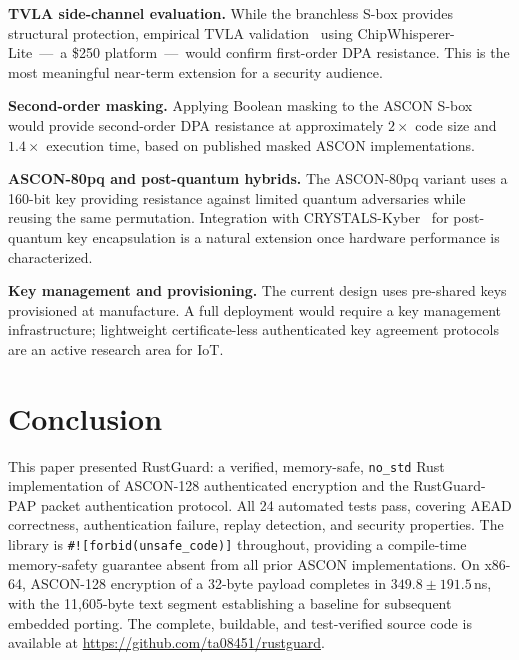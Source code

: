 \documentclass[conference]{IEEEtran}
\begin{document}
\textbf{TVLA side-channel evaluation.}
While the branchless S-box provides structural protection, empirical TVLA
validation~\cite{b19} using ChipWhisperer-Lite~---~a \$250 platform~---~would
confirm first-order DPA resistance. This is the most meaningful near-term
extension for a security audience.

\textbf{Second-order masking.}
Applying Boolean masking to the ASCON S-box would provide second-order DPA
resistance at approximately $2\times$ code size and $1.4\times$ execution time,
based on published masked ASCON implementations.

\textbf{ASCON-80pq and post-quantum hybrids.}
The ASCON-80pq variant uses a 160-bit key providing resistance against limited
quantum adversaries while reusing the same permutation. Integration with
CRYSTALS-Kyber~\cite{b20} for post-quantum key encapsulation is a natural
extension once hardware performance is characterized.

\textbf{Key management and provisioning.}
The current design uses pre-shared keys provisioned at manufacture. A full
deployment would require a key management infrastructure; lightweight
certificate-less authenticated key agreement protocols are an active research
area for IoT.

\section{Conclusion}
\label{sec:conclusion}

This paper presented RustGuard: a verified, memory-safe, \texttt{no\_std}
Rust implementation of ASCON-128 authenticated encryption and the RustGuard-PAP
packet authentication protocol. All 24 automated tests pass, covering AEAD
correctness, authentication failure, replay detection, and security properties.
The library is \texttt{\#![forbid(unsafe\_code)]} throughout, providing a
compile-time memory-safety guarantee absent from all prior ASCON
implementations. On x86-64, ASCON-128 encryption of a 32-byte payload
completes in $349.8 \pm 191.5$\,ns, with the 11{,}605-byte text segment
establishing a baseline for subsequent embedded porting. The complete,
buildable, and test-verified source code is available at
\url{https://github.com/ta08451/rustguard}.
\end{document}

